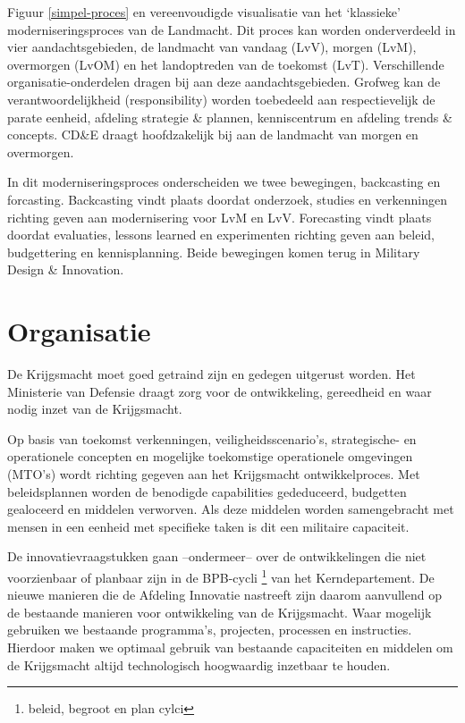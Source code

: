 \documentclass[
]{book}
\begin{document}
Figuur \ref{simpel-proces} en vereenvoudigde visualisatie van het `klassieke' moderniseringsproces van de Landmacht. Dit proces kan worden onderverdeeld in vier aandachtsgebieden, de landmacht van vandaag (LvV), morgen (LvM), overmorgen (LvOM) en het landoptreden van de toekomst (LvT). Verschillende organisatie-onderdelen dragen bij aan deze aandachtsgebieden. Grofweg kan de verantwoordelijkheid (responsibility) worden toebedeeld aan respectievelijk de parate eenheid, afdeling strategie \& plannen, kenniscentrum en afdeling trends \& concepts. CD\&E draagt hoofdzakelijk bij aan de landmacht van morgen en overmorgen.

In dit moderniseringsproces onderscheiden we twee bewegingen, backcasting en forcasting. Backcasting vindt plaats doordat onderzoek, studies en verkenningen richting geven aan modernisering voor LvM en LvV. Forecasting vindt plaats doordat evaluaties, lessons learned en experimenten richting geven aan beleid, budgettering en kennisplanning. Beide bewegingen komen terug in Military Design \& Innovation.

\hypertarget{cde-algemeen}{%
\chapter{Organisatie}\label{cde-algemeen}}

De Krijgsmacht moet goed getraind zijn en gedegen uitgerust worden. Het Ministerie van Defensie draagt zorg voor de ontwikkeling, gereedheid en waar nodig inzet van de Krijgsmacht.

Op basis van toekomst verkenningen, veiligheidsscenario's, strategische- en operationele concepten en mogelijke toekomstige operationele omgevingen (MTO's) wordt richting gegeven aan het Krijgsmacht ontwikkelproces. Met beleidsplannen worden de benodigde capabilities gededuceerd, budgetten gealoceerd en middelen verworven. Als deze middelen worden samengebracht met mensen in een eenheid met specifieke taken is dit een militaire capaciteit.

De innovatievraagstukken gaan --ondermeer-- over de ontwikkelingen die niet voorzienbaar of planbaar zijn in de BPB-cycli \footnote{beleid, begroot en plan cylci} van het Kerndepartement. De nieuwe manieren die de Afdeling Innovatie nastreeft zijn daarom aanvullend op de bestaande manieren voor ontwikkeling van de Krijgsmacht. Waar mogelijk gebruiken we bestaande programma's, projecten, processen en instructies. Hierdoor maken we optimaal gebruik van bestaande capaciteiten en middelen om de Krijgsmacht altijd technologisch hoogwaardig inzetbaar te houden.
\end{document}
